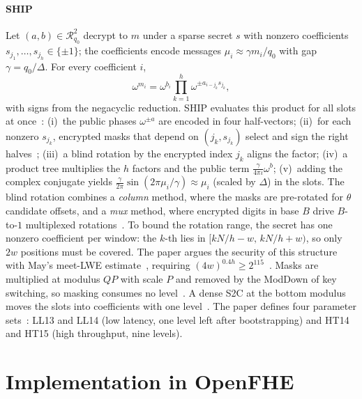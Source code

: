 \documentclass[sigconf,nonacm]{acmart}
\newcommand{\R}{\mathcal{R}}
\begin{document}
\paragraph{SHIP}
Let $(a,b)\in\R_{q_0}^2$ decrypt to $m$ under a sparse secret $s$ with nonzero coefficients $s_{j_1},\dots,s_{j_h}\in\{\pm1\}$; the coefficients encode messages $\mu_i\approx\gamma m_i/q_0$ with gap $\gamma=q_0/\Delta$.
For every coefficient $i$,
\[
\omega^{m_i} = \omega^{b_i}\prod_{k=1}^{h}\omega^{\pm a_{i-j_k} s_{j_k}},
\]
with signs from the negacyclic reduction.
SHIP evaluates this product for all slots at once~\cite[Alg.~1]{CHKS25}:
(i)~the public phases $\omega^{\pm a}$ are encoded in four half-vectors;
(ii)~for each nonzero $s_{j_k}$, encrypted masks that depend on $(j_k,s_{j_k})$ select and sign the right halves~\cite[Lemma~1]{CHKS25};
(iii)~a blind rotation by the encrypted index $j_k$ aligns the factor;
(iv)~a product tree multiplies the $h$ factors and the public term $\frac{\gamma}{4\pi\iota}\omega^{b}$;
(v)~adding the complex conjugate yields $\frac{\gamma}{2\pi}\sin(2\pi\mu_i/\gamma)\approx\mu_i$ (scaled by $\Delta$) in the slots.
The blind rotation combines a \emph{column} method, where the masks are pre-rotated for $\theta$ candidate offsets, and a \emph{mux} method, where encrypted digits in base $B$ drive $B$-to-$1$ multiplexed rotations~\cite[Def.~1, Alg.~3--5]{CHKS25}.
To bound the rotation range, the secret has one nonzero coefficient per window: the $k$-th lies in $[kN/h-w,\,kN/h+w)$, so only $2w$ positions must be covered.
The paper argues the security of this structure with May's meet-LWE estimate~\cite{May21}, requiring $(4w)^{0.4h}\ge 2^{115}$~\cite[\S5.1]{CHKS25}.
Masks are multiplied at modulus $QP$ with scale $P$ and removed by the ModDown of key switching, so masking consumes no level~\cite[\S4.1, \S4.4]{CHKS25}.
A dense S2C at the bottom modulus moves the slots into coefficients with one level~\cite[\S3.2]{CHKS25}.
The paper defines four parameter sets~\cite[Table~2]{CHKS25}: LL13 and LL14 (low latency, one level left after bootstrapping) and HT14 and HT15 (high throughput, nine levels).

\section{Implementation in OpenFHE}
\label{sec:impl}
\end{document}
